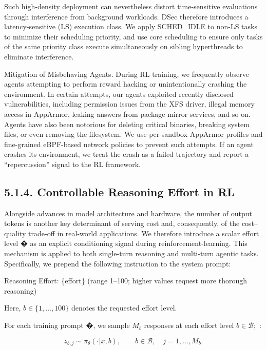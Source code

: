 \documentclass[
  10
]{article}
\begin{document}
Such high-density deployment can nevertheless distort time-sensitive
evaluations through interference from background workloads. DSec
therefore introduces a latency-sensitive (LS) execution class. We apply
SCHED\_IDLE to non-LS tasks to minimize their scheduling priority, and
use core scheduling to ensure only tasks of the same priority class
execute simultaneously on sibling hyperthreads to eliminate
interference.

Mitigation of Misbehaving Agents. During RL training, we frequently
observe agents attempting to perform reward hacking or unintentionally
crashing the environment. In certain attempts, our agents exploited
recently disclosed vulnerabilities, including permission issues from the
XFS driver, illegal memory access in AppArmor, leaking answers from
package mirror services, and so on. Agents have also been notorious for
deleting critical binaries, breaking system files, or even removing the
filesystem. We use per-sandbox AppArmor profiles and fine-grained
eBPF-based network policies to prevent such attempts. If an agent
crashes its environment, we treat the crash as a failed trajectory and
report a ``repercussion'' signal to the RL framework.

\subsection{5.1.4. Controllable Reasoning Effort in
RL}\label{controllable-reasoning-effort-in-rl}

Alongside advances in model architecture and hardware, the number of
output tokens is another key determinant of serving cost and,
consequently, of the cost--quality trade-off in real-world applications.
We therefore introduce a scalar effort level � as an explicit
conditioning signal during reinforcement-learning. This mechanism is
applied to both single-turn reasoning and multi-turn agentic tasks.
Specifically, we prepend the following instruction to the system prompt:

Reasoning Effort: \{effort\} (range 1--100; higher values request more
thorough reasoning)

Here, \(b \in \{ 1 , \dots , 1 0 0 \}\) denotes the requested effort
level.

For each training prompt �, we sample \(M _ { b }\) responses at each
effort level \(b \in { \mathcal { B } } ;\) :

\[
z _ {b, j} \sim \pi_ {\theta} (\cdot | x, b), \qquad b \in \mathcal {B}, \quad j = 1, \ldots , M _ {b}.\tag{8}
\]
\end{document}
